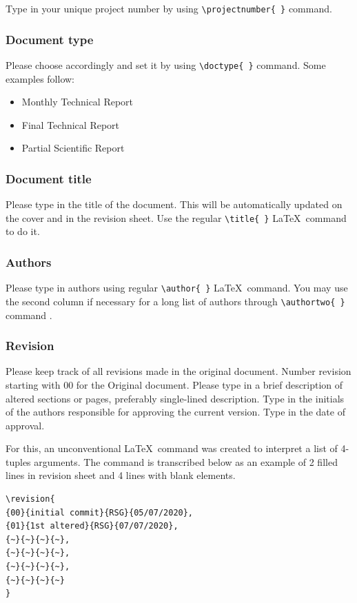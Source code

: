 Type in your unique project number by using \verb+\projectnumber{ }+ command.

\subsubsection{Document type}

Please choose accordingly and set it by using \verb+\doctype{ }+ command. Some examples follow:
\begin{itemize}
    \item Monthly Technical Report
    \item Final Technical Report
    \item Partial Scientific Report
\end{itemize}

\subsubsection{Document title}

Please type in the title of the document. This will be automatically updated on the cover and in the revision sheet. Use the regular \verb+\title{ }+ \LaTeX\ command to do it.

\subsubsection{Authors}

Please type in authors using regular \verb+\author{ }+ \LaTeX\ command. You may use the second column if necessary for a long list of authors through \verb+\authortwo{ }+ command
.
\subsubsection{Revision}

Please keep track of all revisions made in the original document. Number revision starting with 00 for the Original document. Please type in a brief description of altered sections or pages, preferably single-lined description.
Type in the initials of the authors responsible for approving the current version. Type in the date of approval.

For this, an unconventional \LaTeX\ command was created to interpret a list of 4-tuples arguments. The command is transcribed below as an example of 2 filled lines in revision sheet and 4 lines with blank elements.
\begin{verbatim}
\revision{
{00}{initial commit}{RSG}{05/07/2020},
{01}{1st altered}{RSG}{07/07/2020},
{~}{~}{~}{~},
{~}{~}{~}{~},
{~}{~}{~}{~},
{~}{~}{~}{~}
}
\end{verbatim}


